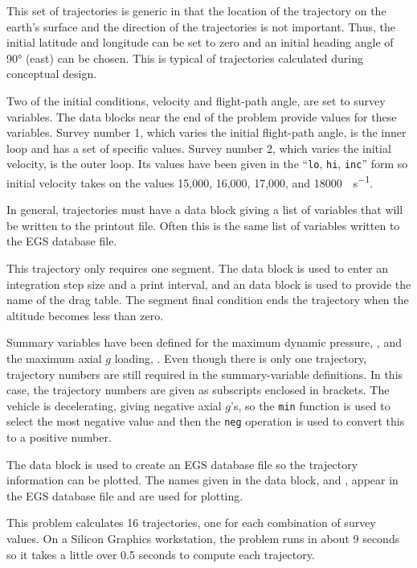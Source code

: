 This set of trajectories is generic in that the location of the trajectory on the earth's
surface and the direction of the trajectories is not important. Thus, the initial latitude
and longitude can be set to zero and an initial heading angle of \ang{90} (east) can be
chosen. This is typical of trajectories calculated during conceptual design.

Two of the initial conditions, velocity and flight-path angle, are set to survey
variables. The  data blocks near the end of the problem
provide values for these variables. Survey number 1, which varies the initial
flight-path angle, is the inner loop and has a set of specific values. Survey number 2,
which varies the initial velocity, is the outer loop. Its values have been given in the
``\texttt{lo}, \texttt{hi}, \texttt{inc}'' form so initial velocity takes on the values
15,000, 16,000, 17,000, and \SI{18000}{\foot\per\second}.

In general, trajectories must have a  data block giving a list of
variables that will be written to the printout file. Often this is the same list of
variables written to the EGS database file.

This trajectory only requires one segment. The  data block is
used to enter an integration step size and a print interval, and an
 data block is used to provide the name of the drag table. The
segment final condition ends the trajectory when the altitude becomes less than
zero.

Summary variables have been defined for the maximum dynamic pressure,
, and the maximum axial $g$ loading, . Even
though there is only one trajectory, trajectory numbers are still required in the
summary-variable definitions. In this case, the trajectory numbers are given as
subscripts enclosed in brackets. The vehicle is decelerating, giving negative axial
$g$'s, so the \texttt{min} function is used to select the most negative value and then
the \texttt{neg} operation is used to convert this to a positive number.

The  data block is used to create an EGS database file so the
trajectory information can be plotted. The names given in the
 data block,  and , appear
in the EGS database file and are used for plotting.


This problem calculates 16 trajectories, one for each combination of survey values.
On a Silicon Graphics workstation, the problem runs in about 9 seconds so it takes
a little over 0.5 seconds to compute each trajectory.

